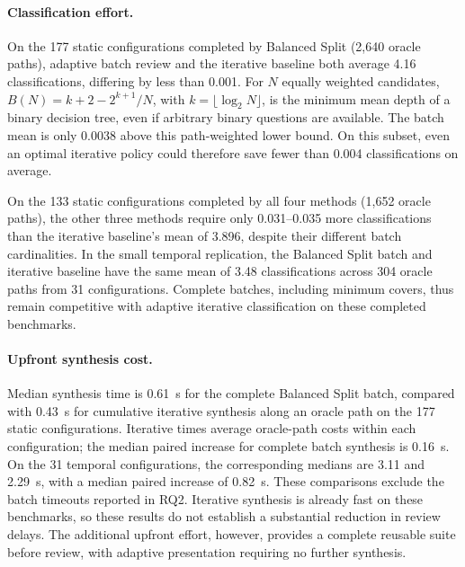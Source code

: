 \documentclass[runningheads]{llncs}
\newcommand{\methodname}[1]{\textup{\textsf{#1}}}
\newcommand{\balancedsplit}{\methodname{Balanced Split}}
\begin{document}
\paragraph{Classification effort.}
On the 177 static configurations completed by \balancedsplit{} (2,640
oracle paths), adaptive batch review and the iterative baseline both average
4.16 classifications, differing by less than 0.001. For $N$ equally weighted
candidates, $B(N)=k+2-2^{k+1}/N$, with $k=\lfloor\log_2N\rfloor$, is the
minimum mean depth of a binary decision tree, even if arbitrary binary
questions are available. The batch mean is only 0.0038 above this
path-weighted lower bound. On this subset, even an optimal iterative policy
could therefore save fewer than 0.004 classifications on average.

On the 133 static configurations completed by all four methods (1,652
oracle paths), the other three methods require only 0.031--0.035 more
classifications than the iterative baseline's mean of 3.896, despite their
different batch cardinalities. In the small temporal replication, the
\balancedsplit{} batch and iterative baseline have the same mean of 3.48
classifications across 304 oracle paths from 31 configurations. Complete
batches, including minimum covers, thus remain competitive with adaptive
iterative classification on these completed benchmarks.

\paragraph{Upfront synthesis cost.}
Median synthesis time is 0.61~s for the complete \balancedsplit{} batch, compared with
0.43~s for cumulative iterative synthesis along an oracle path on the 177
static configurations. Iterative times average oracle-path costs within each
configuration; the median paired increase for complete batch synthesis is
0.16~s. On the 31 temporal
configurations, the corresponding medians are 3.11 and 2.29~s,
with a median paired increase of 0.82~s.
These comparisons exclude the batch timeouts reported in RQ2.
Iterative synthesis is already fast on these benchmarks, so these results do not
establish a substantial reduction in review delays. The additional upfront effort,
however, provides a complete reusable suite before review, with adaptive presentation
requiring no further synthesis.
\end{document}
